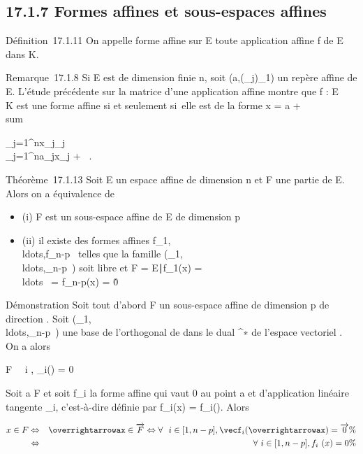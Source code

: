 \documentclass[]{article}
\begin{document}
\subsection{17.1.7 Formes affines et sous-espaces affines}

Définition~17.1.11 On appelle forme affine sur E toute application
affine f de E dans K.

Remarque~17.1.8 Si E est de dimension finie n, soit
(a,(\vece_j)_1\leqj\leqn) un repère
affine de E. L'étude précédente sur la matrice d'une application affine
montre que f : E \rightarrow~ K est une forme affine si et seulement si~elle est de
la forme x = a +\ \\sum

_j=1^nx_j\vece_j\mapsto~\\\sum
 _j=1^na_jx_j + \alpha~.

Théorème~17.1.13 Soit E un espace affine de dimension n et F une partie
de E. Alors on a équivalence de

\begin{itemize}
\itemsep1pt\parskip0pt
\item
  (i) F est un sous-espace affine de E de dimension p
\item
  (ii) il existe des formes affines
  f_1,\\ldots,f_n-p~
  telles que la famille
  (\vecf_1,\\ldots,\vecf_n-p~)
  soit libre et F = \x \in
  E∣f_1(x) =
  \\ldots~ =
  f_n-p(x) = 0\.
\end{itemize}

Démonstration Soit tout d'abord F un sous-espace affine de dimension p
de direction \overrightarrowF. Soit
(\vecf_1,\\ldots,\vecf_n-p~)
une base de l'orthogonal de \overrightarrowF dans le
dual \overrightarrowE^∗ de l'espace
vectoriel \overrightarrowE. On a alors

\overrightarrow\xi \in\overrightarrow
F \Leftrightarrow \forall~~i \in [1,n -
p],
\vecf_i(\overrightarrow\xi)
= 0

Soit a \in F et soit f_i la forme affine qui vaut 0 au point a et
d'application linéaire tangente \vecf_i,
c'est-à-dire définie par f_i(x) =\vec
f_i(\overrightarrowax). Alors

\begin{align*} x \in F& \Leftrightarrow
& \overrightarrowax
\in\overrightarrow F \Leftrightarrow
\forall~~i \in [1,n - p],
\vecf_i(\overrightarrowax)
=\overrightarrow 0\%&
\\ & \Leftrightarrow &
\forall~i \in [1,n - p], f_i~(x) = 0 \%&
\\ \end{align*}
\end{document}
